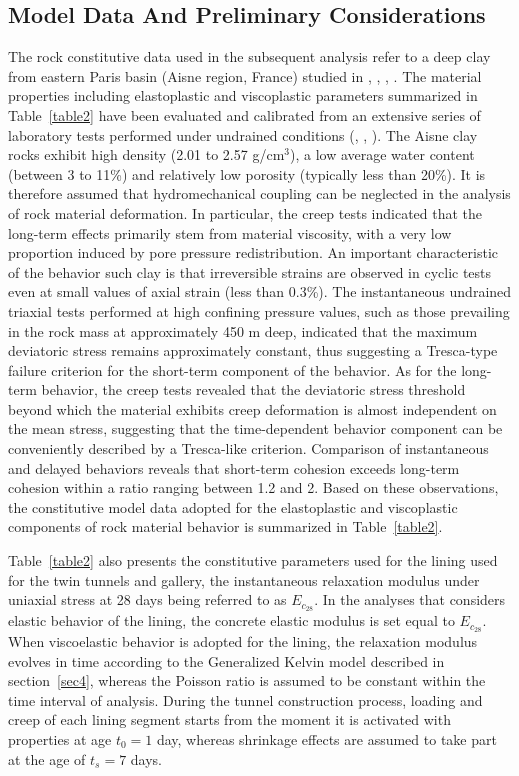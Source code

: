 \documentclass[Journal,letterpaper, NoLists,SectionNumbers]{ascelike-new}
\begin{document}
\subsection{Model Data And Preliminary Considerations}\label{sec71}

The rock constitutive data used in the subsequent analysis refer to a deep clay from eastern Paris basin (Aisne region, France) studied in , , , . The material properties including elastoplastic and viscoplastic parameters summarized in Table~\ref{table2} have been evaluated and calibrated from an extensive series of laboratory tests performed under undrained conditions (, , ). The Aisne clay rocks exhibit high density (2.01 to 2.57 g/cm$^3$), a low average water content (between 3 to 11\%) and relatively low porosity (typically less than 20\%). It is therefore assumed that hydromechanical coupling can be neglected in the analysis of rock material deformation. In particular, the creep tests indicated that the long-term effects primarily stem from material viscosity, with a very low proportion induced by pore pressure redistribution. An important characteristic of the behavior such clay is that irreversible strains are observed in cyclic tests even at small values of axial strain (less than 0.3\%). The instantaneous undrained triaxial tests performed at high confining pressure values, such as those prevailing in the rock mass at approximately 450 m deep, indicated that the maximum deviatoric stress remains approximately constant, thus suggesting a Tresca-type failure criterion for the short-term component of the behavior. As for the long-term behavior, the creep tests revealed that the deviatoric stress threshold beyond which the material exhibits creep deformation is almost independent on the mean stress, suggesting that the time-dependent behavior component can be conveniently described by a Tresca-like criterion. Comparison of instantaneous and delayed behaviors reveals that short-term cohesion exceeds long-term cohesion within a ratio ranging between 1.2 and 2.  Based on these observations, the constitutive model data adopted for the elastoplastic and viscoplastic components of rock material behavior is summarized in Table~\ref{table2}.

Table~\ref{table2} also presents the constitutive parameters used for the lining used for the twin tunnels and gallery, the instantaneous relaxation modulus under uniaxial stress at 28 days being referred to as $E_{c_{28}}$. In the analyses that considers elastic behavior of the lining, the concrete elastic modulus is set equal to $E_{c_{28}}$. When viscoelastic behavior is adopted for the lining, the relaxation modulus evolves in time according to the Generalized Kelvin model described in section~\ref{sec4}, whereas the Poisson ratio is assumed to be constant within the time interval of analysis. During the tunnel construction process, loading and creep of each lining segment starts from the moment it is activated with properties at age $t_0=1$ day, whereas shrinkage effects are assumed to take part at the age of $t_s=7$ days.
\end{document}
